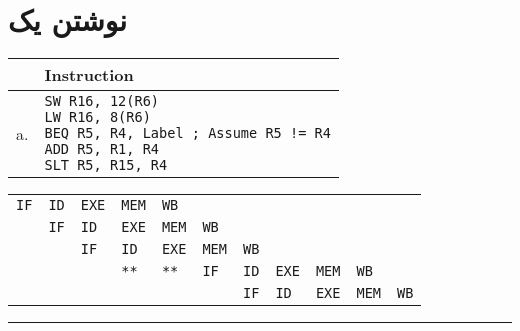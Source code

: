 \documentclass[11pt, dvipsnames, svgnames, x11names]{article}
\begin{document}
\section{نوشتن یک }
\begin{latin}
\begin{table}[H]
\begin{center}
\begin{tabular}{|c|l|}
\hline
& Instruction \\
\hline
a. &
\makecell[l]{
\texttt{SW R16, 12(R6)} \\ 
\texttt{LW R16, 8(R6)} \\ 
\texttt{BEQ R5, R4, Label ; Assume R5 != R4} \\
\texttt{ADD R5, R1, R4} \\ 
\texttt{SLT R5, R15, R4}} \\
\hline
\end{tabular}
\end{center}
\end{table}
\end{latin}
\begin{latin}
\begin{table}[H]
\begin{center}
\begin{tabular}{|p{0.5cm}p{0.5cm}p{0.5cm}p{0.5cm}p{0.5cm}p{0.5cm}p{0.5cm}p{0.5cm}p{0.5cm}p{0.5cm}p{0.5cm}|}
\hline
\texttt{IF}&
\texttt{ID}&
\texttt{EXE}&
\texttt{MEM}&
\texttt{WB}&
&
&
&
&
&
\\
&
\texttt{IF}&
\texttt{ID}&
\texttt{EXE}&
\texttt{MEM}&
\texttt{WB}&
&
&
&
&
\\
&
&
\texttt{IF}&
\texttt{ID}&
\texttt{EXE}&
\texttt{MEM}&
\texttt{WB}&
&
&
&
\\
&
&
&
\texttt{**}&
\texttt{**}&
\texttt{IF}&
\texttt{ID}&
\texttt{EXE}&
\texttt{MEM}&
\texttt{WB}&
\\
&
&
&
&
&
&
\texttt{IF}&
\texttt{ID}&
\texttt{EXE}&
\texttt{MEM}&
\texttt{WB}\\
\hline
\end{tabular}
\end{center}
\end{table}
\end{latin}

\hrule
\vspace{0.5cm}
\end{document}
